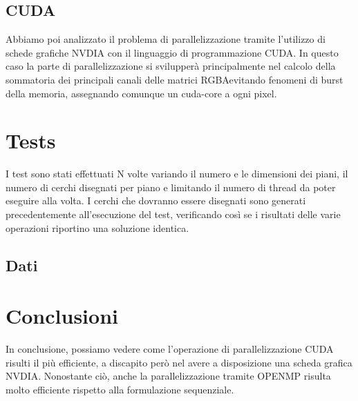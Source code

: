 \documentclass[11pt]{article}
\begin{document}
        \subsection{CUDA}\label{subsec:cuda}
            Abbiamo poi analizzato il problema di parallelizzazione tramite l'utilizzo di schede grafiche NVDIA
            con il linguaggio di programmazione CUDA\@.
            In questo caso la parte di parallelizzazione si svilupperà principalmente nel calcolo della sommatoria
            dei principali canali delle matrici RGBA\@ evitando fenomeni di burst della memoria, assegnando comunque
            un cuda-core a ogni pixel.
        \clearpage

    \section{Tests}\label{sec:tests}
        I test sono stati effettuati N volte variando il numero e le dimensioni dei piani, il numero di cerchi disegnati
        per piano e limitando il numero di thread da poter eseguire alla volta.
        I cerchi che dovranno essere disegnati sono generati precedentemente all'esecuzione del test, verificando
        così se i risultati delle varie operazioni riportino una soluzione identica.
        \subsection{Dati}\label{subsec:dati}

        \clearpage

    \section{Conclusioni}\label{sec:conclusioni}
        In conclusione, possiamo vedere come l'operazione di parallelizzazione CUDA risulti il più efficiente, a
        discapito però nel avere a disposizione una scheda grafica NVDIA\@.
        Nonostante ciò, anche la parallelizzazione tramite OPENMP risulta molto efficiente rispetto alla formulazione
        sequenziale.
\end{document}
